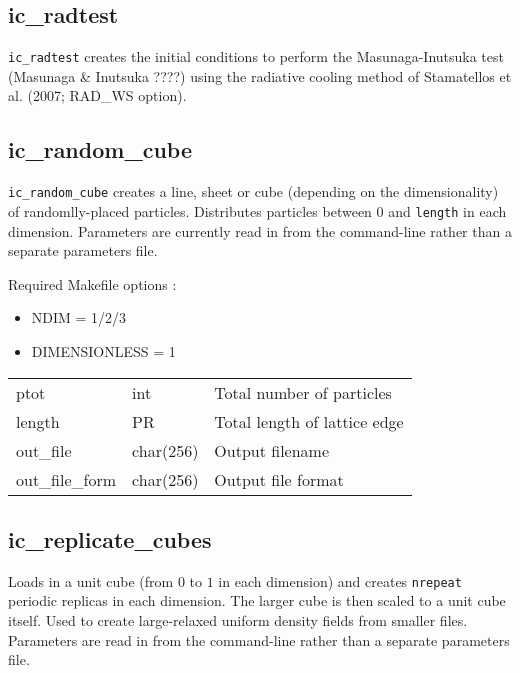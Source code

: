 \documentclass[a4paper]{article}
\newcommand{\var}[1]{\texttt{#1}}
\begin{document}
\newpage


\subsection{ic\_radtest}
\var{ic\_radtest} creates the initial conditions to perform the Masunaga-Inutsuka test (Masunaga \& Inutsuka ????) using the radiative cooling method of Stamatellos et al. (2007; RAD\_WS option).


\subsection{ic\_random\_cube}
\var{ic\_random\_cube} creates a line, sheet or cube (depending on the dimensionality) of randomlly-placed particles.  Distributes particles between $0$ and \var{length} in each dimension. Parameters are currently read in from the command-line rather than a separate parameters file. \newline

\noindent Required Makefile options :
\begin{itemize}
\item NDIM = 1/2/3
\item DIMENSIONLESS = 1
\end{itemize}

\vspace{0.1cm}

\begin{center}
\begin{supertabular}{|p{3cm}|p{2cm}|p{8cm}|}
ptot             & int       & Total number of particles \\
length           & PR        & Total length of lattice edge \\
out\_file        & char(256) & Output filename \\
out\_file\_form  & char(256) & Output file format \\
\end{supertabular}
\end{center}


\subsection{ic\_replicate\_cubes}
Loads in a unit cube (from $0$ to $1$ in each dimension) and creates \var{nrepeat} periodic replicas in each dimension.  The larger cube is then scaled to a unit cube itself.  Used to create large-relaxed uniform density fields from smaller files.  Parameters are read in from the command-line rather than a separate parameters file. \newline
\end{document}
